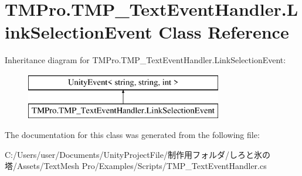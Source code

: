 \hypertarget{class_t_m_pro_1_1_t_m_p___text_event_handler_1_1_link_selection_event}{}\section{T\+M\+Pro.\+T\+M\+P\+\_\+\+Text\+Event\+Handler.\+Link\+Selection\+Event Class Reference}
\label{class_t_m_pro_1_1_t_m_p___text_event_handler_1_1_link_selection_event}
Inheritance diagram for T\+M\+Pro.\+T\+M\+P\+\_\+\+Text\+Event\+Handler.\+Link\+Selection\+Event\+:\begin{figure}[H]
\begin{center}
\leavevmode
\includegraphics[height=2.000000cm]{class_t_m_pro_1_1_t_m_p___text_event_handler_1_1_link_selection_event}
\end{center}
\end{figure}


The documentation for this class was generated from the following file\+:\begin{DoxyCompactItemize}
\item 
C\+:/\+Users/user/\+Documents/\+Unity\+Project\+File/制作用フォルダ/しろと氷の塔/\+Assets/\+Text\+Mesh Pro/\+Examples/\+Scripts/T\+M\+P\+\_\+\+Text\+Event\+Handler.\+cs\end{DoxyCompactItemize}
